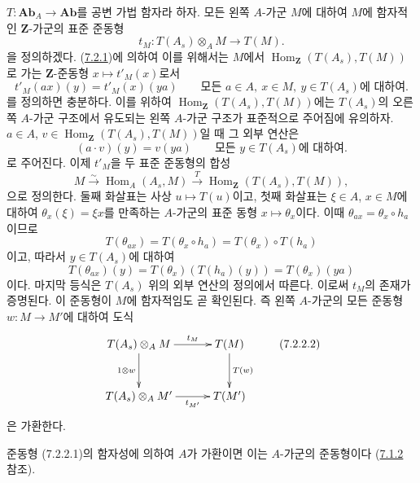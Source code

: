 \begin{env}[7.2.2]
\label{III.7.2.2-fr}
$T:\mathbf{Ab}_A\to\mathbf{Ab}$를 공변 가법 함자라 하자. 모든 왼쪽
$A$-가군 $M$에 대하여 $M$에 함자적인 $\mathbf Z$-가군의 표준 준동형
\[
  t_M:T(A_s)\otimes_A M\longrightarrow T(M).
  \tag{7.2.2.1}\label{III.7.2.2.1.fr}
\]
을 정의하겠다. (\hyperref[III.7.2.1-fr]{7.2.1})에 의하여 이를 위해서는
$M$에서 $\operatorname{Hom}_{\mathbf Z}(T(A_s),T(M))$로 가는
$\mathbf Z$-준동형 $x\mapsto t'_M(x)$로서
\[
  t'_M(ax)(y)=t'_M(x)(ya)
  \qquad\text{모든 }a\in A,\ x\in M,\ y\in T(A_s)\text{에 대하여}.
\]
를 정의하면 충분하다. 이를 위하여
$\operatorname{Hom}_{\mathbf Z}(T(A_s),T(M))$에는 $T(A_s)$의 오른쪽
$A$-가군 구조에서 유도되는 왼쪽 $A$-가군 구조가 표준적으로
주어짐에 유의하자. $a\in A$,
$v\in\operatorname{Hom}_{\mathbf Z}(T(A_s),T(M))$일 때 그 외부 연산은
\[
  (a\cdot v)(y)=v(ya)
  \qquad\text{모든 }y\in T(A_s)\text{에 대하여}.
\]
로 주어진다. 이제 $t'_M$을 두 표준 준동형의 합성
\[
  M\xrightarrow{\sim}\operatorname{Hom}_A(A_s,M)
  \xrightarrow{T}
  \operatorname{Hom}_{\mathbf Z}(T(A_s),T(M)),
\]
으로 정의한다. 둘째 화살표는 사상 $u\mapsto T(u)$이고, 첫째 화살표는
$\xi\in A$, $x\in M$에 대하여 $\theta_x(\xi)=\xi x$를 만족하는
$A$-가군의 표준 동형 $x\mapsto\theta_x$이다. 이때
$\theta_{ax}=\theta_x\circ h_a$이므로
\[
  T(\theta_{ax})
  =
  T(\theta_x\circ h_a)
  =
  T(\theta_x)\circ T(h_a)
\]
이고, 따라서 $y\in T(A_s)$에 대하여
\[
  T(\theta_{ax})(y)
  =
  T(\theta_x)(T(h_a)(y))
  =
  T(\theta_x)(ya)
\]
이다. 마지막 등식은 $T(A_s)$ 위의 외부 연산의 정의에서 따른다.
이로써 $t_M$의 존재가 증명된다. 이 준동형이 $M$에 함자적임도
곧 확인된다. 즉 왼쪽 $A$-가군의 모든 준동형 $w:M\to M'$에 대하여
도식
\[
\xymatrix@C=30pt@R=30pt{
  T(A_s)\otimes_A M
  \ar[r]^-{t_M}\ar[d]_{1\otimes w}
  &
  T(M)\ar[d]^{T(w)}
  \\
  T(A_s)\otimes_A M'
  \ar[r]_-{t_{M'}}
  &
  T(M')
}
\tag{7.2.2.2}\label{III.7.2.2.2.fr}
\]
은 가환한다.

준동형 (7.2.2.1)의 함자성에 의하여 $A$가 가환이면 이는 $A$-가군의
준동형이다 (\hyperref[III.7.1.2-fr]{7.1.2} 참조).
\end{env}

